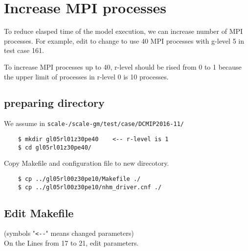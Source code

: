 \section{Increase MPI processes}
 \noindent To reduce elasped time of the model execution, we can increase
 number of MPI processes. For example, edit to change to use 40 MPI processes
 with g-level 5 in test case 161.

 To increase MPI processes up to 40, r-level should be rised from 0 to 1
 because the upper limit of processes in r-level 0 is 10 processes.

\subsection{preparing directory}
 We assume in \texttt{scale-{\version}/scale-gm/test/case/DCMIP2016-11/}
 \begin{verbatim}
    $ mkdir gl05rl01z30pe40    <-- r-level is 1
    $ cd gl05rl01z30pe40/
 \end{verbatim}

 \noindent Copy Makefile and configuration file to new direcotory.
 \begin{verbatim}
    $ cp ../gl05rl00z30pe10/Makefile ./
    $ cp ../gl05rl00z30pe10/nhm_driver.cnf ./
 \end{verbatim}

\subsection{Edit Makefile}
 (symbols "\verb|<--|" means changed parameters) \\
 On the Lines from 17 to 21, edit parameters.

